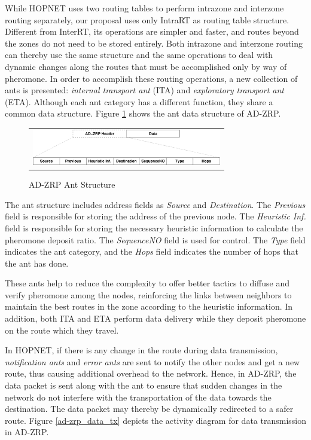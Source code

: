 \documentclass[conference]{IEEEtran}
\begin{document}
While HOPNET uses two routing tables to perform intrazone and interzone routing separately, our proposal uses only IntraRT as routing table structure.
Different from InterRT, its operations are simpler and faster, and routes beyond the zones do not need to be stored entirely.
Both intrazone and interzone routing can thereby use the same structure and the same operations to deal with dynamic changes along the routes that must be accomplished only by way of pheromone.
In order to accomplish these routing operations, a new collection of ants is presented: \emph{internal transport ant} (ITA) and \emph{exploratory transport ant} (ETA).
Although each ant category has a different function, they share a common data structure.
Figure \ref{ad-zrp_protocol} shows the ant data structure of AD-ZRP.

\begin{figure}[htb]
\centering
\begin{tabular}{c}
\includegraphics[width=235pt]{fig/ad-zrp_protocol.pdf}
\end{tabular}
\caption{AD-ZRP Ant Structure}
\label{ad-zrp_protocol}
\end{figure}

The ant structure includes address fields as \emph{Source} and \emph{Destination}.
The \emph{Previous} field is responsible for storing the address of the previous node.
The \emph{Heuristic Inf.} field is responsible for storing the necessary heuristic information to calculate the pheromone deposit ratio.
The \emph{SequenceNO} field is used for control.
The \emph{Type} field indicates the ant category, and the \emph{Hops} field indicates the number of hops that the ant has done.

These ants help to reduce the complexity to offer better tactics to diffuse and verify pheromone among the nodes, reinforcing the links between neighbors to maintain the best routes in the zone according to the heuristic information.
In addition, both ITA and ETA perform data delivery while they deposit pheromone on the route which they travel.

In HOPNET, if there is any change in the route during data transmission, \emph{notification ants} and \emph{error ants} are sent to notify the other nodes and get a new route, thus causing additional overhead to the network.
Hence, in AD-ZRP, the data packet is sent along with the ant to ensure that sudden changes in the network do not interfere with the transportation of the data towards the destination.
The data packet may thereby be dynamically redirected to a safer route.
Figure \ref{ad-zrp_data_tx} depicts the activity diagram for data transmission in AD-ZRP.
\end{document}

